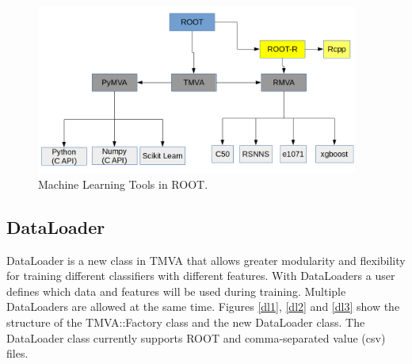 \documentclass[a4paper]{jpconf}
\begin{document}
\begin{figure}[h]
\centering
\includegraphics[width=25pc]{img/tmva.png}\caption{\label{tmva:label} Machine Learning Tools in ROOT.}
\end{figure}

\subsection{DataLoader}
DataLoader is a new class in TMVA that allows greater modularity and flexibility for training different classifiers with different features. With DataLoaders a user defines which data and features will be used during training. Multiple DataLoaders are allowed at the same time. Figures \ref{dl1}, \ref{dl2} and \ref{dl3} show the structure of the TMVA::Factory class and the new DataLoader class. The DataLoader class currently supports ROOT and comma-separated value (csv) files.
\end{document}
